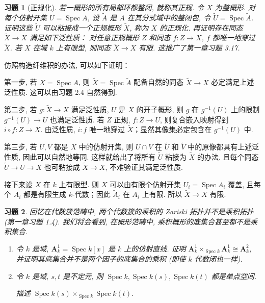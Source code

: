 \documentclass{article}
\theoremstyle{exercise}
\newtheorem{exercise}{习题}[section]
\newenvironment{proofc}{\proof}{\endproof}
\def\A{\mathbf{A}}
\def\Spec{\operatorname{Spec}}
\begin{document}
\begin{exercise}[正规化]
  若一概形的所有局部环都整闭, 就称其\emph{正规}.
  令 $X$ 为整概形. 对每个仿射开集 $U = \Spec A$, 设 $\tilde{A}$ 是 $A$ 在其分式域中的整闭包,
  令 $\tilde{U} = \Spec \tilde{A}$. 证明这些 $\tilde{U}$ 可以粘接成一个正规概形 $\tilde{X}$,
  称为 $X$ 的\emph{正规化}.
  再证明存在同态 $\tilde{X} \to X$ 满足如下泛性质：
  对任意正规概形 $Z$ 和同态 $f \colon Z \to X$, $f$ 都唯一地穿过 $\tilde{X}$.
  若 $X$ 在域 $k$ 上有限型, 则同态 $\tilde{X} \to X$ 有限.
  这推广了第一章习题 3.17.
\end{exercise}

\begin{proofc}
  仿照构造纤维积的办法, 可以如下证明：

  第一步, 若 $X = \Spec A$, 则 $\tilde{X} = \Spec \tilde{A}$
  配备自然的同态 $\tilde{X} \to X$ 必定满足上述泛性质.
  这可以由习题 2.4 自然得到.

  第二步, 若 $g \colon \tilde{X} \to X$ 满足泛性质,
  $U$ 是 $X$ 的开子概形, 则 $g$ 在 $g^{-1}(U)$ 上的限制 $g^{-1}(U) \to U$ 也满足泛性质.
  若 $Z$ 正规, $f \colon Z \to U$, 则复合嵌入映射得到 $i \circ f \colon Z \to X$.
  由泛性质, $i \colon f$ 唯一地穿过 $\tilde{X}$；显然其像集必定包含在 $g^{-1}(U)$ 中.

  第三步, 若 $U, V$ 都是 $X$ 中的仿射开集, 则 $U \cap V$ 在 $\tilde{U}$ 和 $\tilde{V}$
  中的原像都具有上述泛性质, 因此可以自然地等同.
  这样就给出了将所有 $\tilde{U}$ 粘接为 $\tilde{X}$ 的办法.
  且每个同态 $\tilde{U} \to U \to X$ 也可粘接成 $\tilde{X} \to X$,
  不难验证其满足泛性质.

  接下来设 $X$ 在 $k$ 上有限型. 则 $X$ 可以由有限个仿射开集 $U_i = \Spec A_i$ 覆盖,
  且每个 $A_i$ 都是有限生成 $k$-代数；因此 $\tilde{A}_i$ 在 $A_i$ 上有限.
  所以 $\tilde{X} \to X$ 有限.
\end{proofc}

\begin{exercise}
  回忆在代数簇范畴中, 两个代数簇的乘积的 Zariski 拓扑并不是乘积拓扑 (第一章习题 1.4).
  我们将会看到, 在概形范畴中, 乘积概形的底集合甚至都不是乘积集合.
  \begin{enumerate}[label={(\alph*)}]
    \item 令 $k$ 是域, $\A_k^1 = \Spec k[x]$ 是 $k$ 上的仿射直线.
          证明 $\A_k^1 \times_{\Spec k} \A_k^1 \cong \A_k^2$,
          并证明其底集合并不是两个因子的底集合的乘积 (即使 $k$ 代数闭也一样).
    \item 令 $k$ 是域, $s, t$ 是不定元, 则 $\Spec k, \Spec k(s), \Spec k(t)$
          都是单点空间.

          描述 $\Spec k(s) \times_{\Spec k} \Spec k(t)$.
  \end{enumerate}
\end{exercise}
\end{document}
